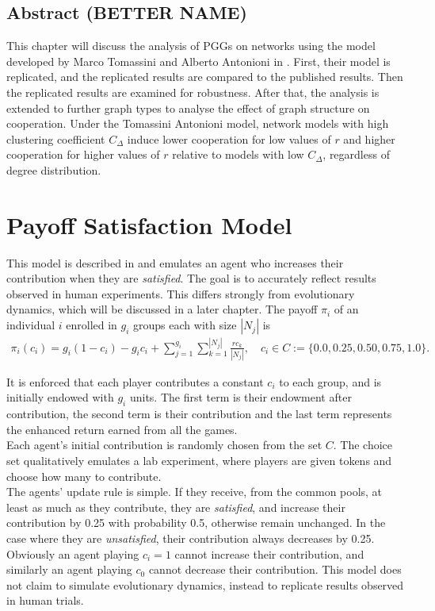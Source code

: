 

\subsection{Abstract (BETTER NAME)}
This chapter will discuss the analysis of PGGs on networks using the model developed by Marco Tomassini and Alberto Antonioni in \cite{RN49}. First, their model is replicated, and the replicated results are compared to the published results. Then the replicated results are examined for robustness. After that, the analysis is extended to further graph types to analyse the effect of graph structure on cooperation. Under the Tomassini Antonioni model, network models with high clustering coefficient $C_\Delta$ induce lower cooperation for low values of $r$ and higher cooperation for higher values of $r$ relative to models with low $C_\Delta$, regardless of degree distribution. \\

\section{Payoff Satisfaction Model}
This model is described in \cite{RN49} and emulates an agent who increases their contribution when they are \emph{satisfied}. The goal is to accurately reflect results observed in human experiments. This differs strongly from evolutionary dynamics, which will be discussed in a later chapter. The payoff $\pi_i$ of an individual $i$ enrolled in $g_i$ groups each with size $|N_j|$ is \\
\begin{align} 
    \pi_i(c_i) = g_i(1-c_i) - g_ic_i + \sum_{j=1}^{g_i} \sum_{k=1}^{|N_j|} \frac{rc_k}{|N_j|}, \quad c_i \in C:= \{0.0, 0.25, 0.50, 0.75, 1.0\}. 
\end{align}

It is enforced that each player contributes a constant $c_i$ to each group, and is initially endowed with $g_i$ units. The first term is their endowment after contribution, the second term is their contribution and the last term represents the enhanced return earned from all the games. \\

Each agent's initial contribution is randomly chosen from the set $C$. The choice set qualitatively emulates a lab experiment, where players are given tokens and choose how many to contribute. \\

The agents' update rule is simple. If they receive, from the common pools, at least as much as they contribute, they are \emph{satisfied}, and increase their contribution by 0.25 with probability 0.5, otherwise remain unchanged. In the case where they are \emph{unsatisfied}, their contribution always decreases by 0.25. Obviously an agent playing $c_i =1$ cannot increase their contribution, and similarly an agent playing $c_0$ cannot decrease their contribution. This model does not claim to simulate evolutionary dynamics, instead to replicate results observed in human trials. \\


